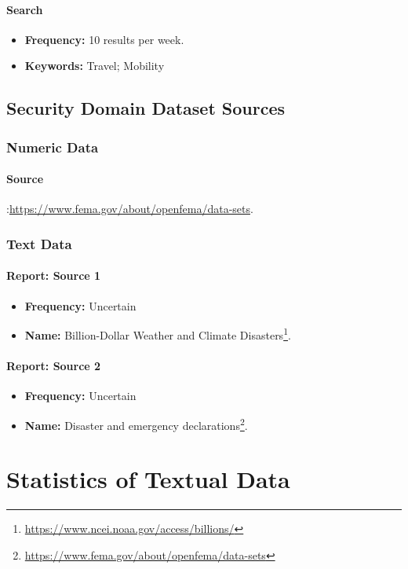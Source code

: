 \paragraph{Search}
\begin{itemize}
    \item \textbf{Frequency:} 10 results per week.
    \item \textbf{Keywords:} Travel; Mobility
\end{itemize}


\subsection{Security Domain Dataset Sources}


\subsubsection{Numeric Data}
\paragraph{Source}:\url{https://www.fema.gov/about/openfema/data-sets}.

\subsubsection{Text Data}
\paragraph{Report: Source 1}
\begin{itemize}
    \item \textbf{Frequency:} Uncertain
    \item \textbf{Name:} Billion-Dollar Weather and Climate Disasters\footnote{\href{https://www.ncei.noaa.gov/access/billions/}{https://www.ncei.noaa.gov/access/billions/}}.
\end{itemize}
\paragraph{Report: Source 2}
\begin{itemize}
    \item \textbf{Frequency:} Uncertain
    \item \textbf{Name:} Disaster and emergency declarations\footnote{\url{https://www.fema.gov/about/openfema/data-sets}}.
\end{itemize}

\newpage
\section{Statistics of Textual Data}\label{app:text_statistics}

